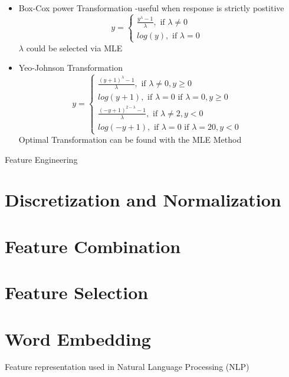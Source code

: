 \documentclass[11pt, openany]{book}              %
\begin{document}
\begin{itemize}
    \item Box-Cox power Transformation -useful when response is strictly postitive
    $$y = \left\{
             \begin{array}{lr}
             \frac{y^\lambda -1}{\lambda}, \text{ if }\lambda \neq 0 &  \\
             log(y), \text{ if }\lambda = 0 &  
             \end{array}
      \right.$$
      $\lambda$ could be selected via MLE
    \item Yeo-Johnson Transformation
     $$y = \left\{
             \begin{array}{lr}
             \frac{(y+1)^\lambda -1}{\lambda}, \text{ if }\lambda \neq 0, y \geq 0 &  \\
             log(y+1), \text{ if }\lambda = 0 \text{ if }\lambda = 0, y \geq 0 &  \\
              \frac{(-y+1)^{2-\lambda} -1}{\lambda}, \text{ if }\lambda \neq 2, y < 0 &  \\
				log(-y+1), \text{ if }\lambda = 0 \text{ if }\lambda =2 0, y < 0 & 
			  
             \end{array}
      \right.$$ Optimal Transformation can be found with the MLE Method
\end{itemize}

Feature Engineering
\section{Discretization and Normalization}
\section{Feature Combination}
\section{Feature Selection}

\section{Word Embedding}

Feature representation used in Natural Language Processing (NLP)
\end{document}
